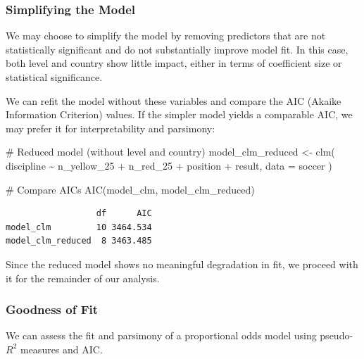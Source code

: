 \documentclass[
  letterpaper,
  DIV=11,
  numbers=noendperiod]{scrartcl}
\newenvironment{Shaded}{\begin{snugshade}}{\end{snugshade}}
\newcommand{\AttributeTok}[1]{\textcolor[rgb]{0.40,0.45,0.13}{#1}}
\newcommand{\CommentTok}[1]{\textcolor[rgb]{0.37,0.37,0.37}{#1}}
\newcommand{\FunctionTok}[1]{\textcolor[rgb]{0.28,0.35,0.67}{#1}}
\newcommand{\NormalTok}[1]{\textcolor[rgb]{0.00,0.23,0.31}{#1}}
\newcommand{\OtherTok}[1]{\textcolor[rgb]{0.00,0.23,0.31}{#1}}
\newcommand{\SpecialCharTok}[1]{\textcolor[rgb]{0.37,0.37,0.37}{#1}}
\begin{document}
\hypertarget{simplifying-the-model}{%
\subsubsection*{Simplifying the Model}\label{simplifying-the-model}}

We may choose to simplify the model by removing predictors that are not
statistically significant and do not substantially improve model fit. In
this case, both level and country show little impact, either in terms of
coefficient size or statistical significance.

We can refit the model without these variables and compare the AIC
(Akaike Information Criterion) values. If the simpler model yields a
comparable AIC, we may prefer it for interpretability and parsimony:

\begin{Shaded}
\begin{Highlighting}[]
\CommentTok{\# Reduced model (without level and country)}
\NormalTok{model\_clm\_reduced }\OtherTok{\textless{}{-}} \FunctionTok{clm}\NormalTok{(}
\NormalTok{  discipline }\SpecialCharTok{\textasciitilde{}}\NormalTok{ n\_yellow\_25 }\SpecialCharTok{+}\NormalTok{ n\_red\_25 }\SpecialCharTok{+}\NormalTok{ position }\SpecialCharTok{+}\NormalTok{ result,}
  \AttributeTok{data =}\NormalTok{ soccer}
\NormalTok{)}

\CommentTok{\# Compare AICs}
\FunctionTok{AIC}\NormalTok{(model\_clm, model\_clm\_reduced)}
\end{Highlighting}
\end{Shaded}

\begin{verbatim}
                  df      AIC
model_clm         10 3464.534
model_clm_reduced  8 3463.485
\end{verbatim}

Since the reduced model shows no meaningful degradation in fit, we
proceed with it for the remainder of our analysis.

\hypertarget{goodness-of-fit}{%
\subsubsection*{Goodness of Fit}\label{goodness-of-fit}}

We can assess the fit and parsimony of a proportional odds model using
pseudo-\(R^2\) measures and AIC.
\end{document}
